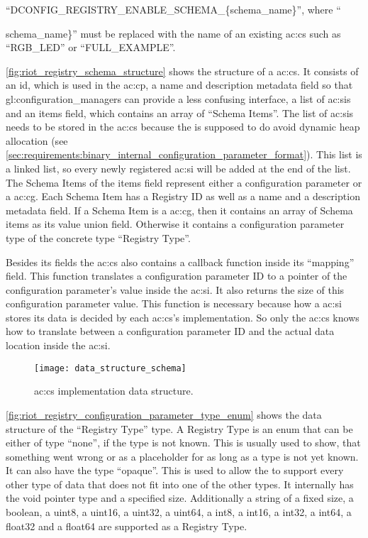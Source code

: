 ``DCONFIG\_REGISTRY\_ENABLE\_SCHEMA\_\{schema\_name\}'', where ``{schema\_name\}'' must be replaced with the name of an existing \gls{ac:cs} such as ``RGB\_LED'' or ``FULL\_EXAMPLE''.

\autoref{fig:riot_registry_schema_structure} shows the structure of a \gls{ac:cs}.
It consists of an id, which is used in the \gls{ac:cp}, a name and description metadata field so that \glspl{gl:configuration_manager} can provide a less confusing interface, a list of \glspl{ac:si} and an items field, which contains an array of ``Schema Items''.
The list of \glspl{ac:si} needs to be stored in the \gls{ac:cs} because the  is supposed to do avoid dynamic heap allocation (see \autoref{sec:requirements:binary_internal_configuration_parameter_format}). This list is a linked list, so every newly registered \gls{ac:si} will be added at the end of the list.
The Schema Items of the items field represent either a configuration parameter or a \gls{ac:cg}. Each Schema Item has a Registry ID as well as a name and a description metadata field. If a Schema Item is a \gls{ac:cg}, then it contains an array of Schema items as its value union field. Otherwise it contains a configuration parameter type of the concrete type ``Registry Type''.

Besides its fields the \gls{ac:cs} also contains a callback function inside its ``mapping'' field.
This function translates a configuration parameter ID to a pointer of the configuration parameter's value inside the \gls{ac:si}.
It also returns the size of this configuration parameter value.
This function is necessary because how a \gls{ac:si} stores its data is decided by each \gls{ac:cs}'s implementation. So only the \gls{ac:cs} knows how to translate between a configuration parameter ID and the actual data location inside the \gls{ac:si}.

\begin{figure}[H]
    \centering
    \texttt{[image: data\_structure\_schema]}
    \caption{ \gls{ac:cs} implementation data structure.}
    \label{fig:riot_registry_schema_structure}
\end{figure}

\autoref{fig:riot_registry_configuration_parameter_type_enum} shows the data structure of the ``Registry Type'' type.
A Registry Type is an enum that can be either of type ``none'', if the type is not known.
This is usually used to show, that something went wrong or as a placeholder for as long as a type is not yet known.
It can also have the type ``opaque''.
This is used to allow the  to support every other type of data that does not fit into one of the other types.
It internally has the void pointer type and a specified size.
Additionally a string of a fixed size, a boolean, a uint8, a uint16, a uint32, a uint64, a int8, a int16, a int32, a int64, a float32 and a float64 are supported as a Registry Type.

}
